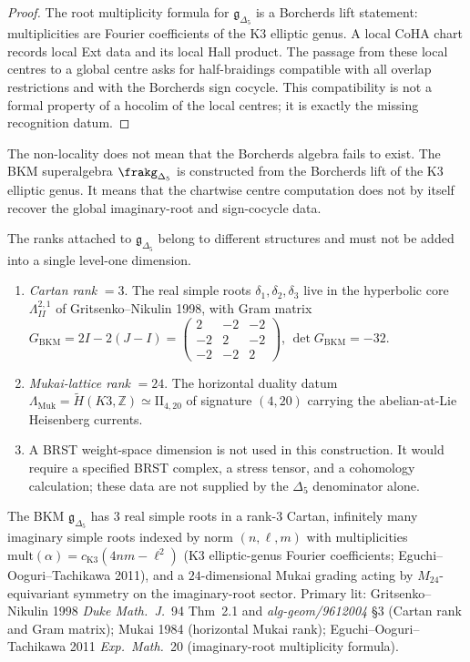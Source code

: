 \begin{proof}
The root multiplicity formula for \(\mathfrak g_{\Delta_5}\) is a
Borcherds lift statement: multiplicities are Fourier coefficients of
the K3 elliptic genus. A local CoHA chart records local Ext data and
its local Hall product. The passage from these local centres to a
global centre asks for half-braidings compatible with all overlap
restrictions and with the Borcherds sign cocycle. This compatibility is
not a formal property of a hocolim of the local centres; it is exactly
the missing recognition datum.
\end{proof}

\begin{remark}
\label{rem:k3e-nonlocality-interpretation}
The non-locality does not mean that the Borcherds algebra fails to
exist. The BKM superalgebra \(\frakg_{\Delta_5}\) is constructed from
the Borcherds lift of the K3 elliptic genus. It means that the
chartwise centre computation does not by itself recover the global
imaginary-root and sign-cocycle data.
\end{remark}

\begin{remark}
\label{rem:drinfeld-center-rank-discipline}
The ranks attached to \(\mathfrak{g}_{\Delta_5}\) belong to different
structures and must not be added into a single level-one dimension.
\begin{enumerate}[label=\textup{(\roman*)}]
\item \emph{Cartan rank} $= 3$. The real simple roots
 $\delta_1,\delta_2,\delta_3$ live in the hyperbolic core
 $\Lambda^{2,1}_{II}$ of Gritsenko--Nikulin 1998, with Gram matrix
 $G_{\mathrm{BKM}} = 2I - 2(J-I) = \begin{pmatrix}2&-2&-2\\-2&2&-2\\-2&-2&2\end{pmatrix}$,
 $\det G_{\mathrm{BKM}} = -32$.
\item \emph{Mukai-lattice rank} $= 24$. The horizontal duality datum
 $\Lambda_{\mathrm{Muk}} = \widetilde H(K3,\mathbb Z)\simeq\mathrm{II}_{4,20}$
 of signature $(4,20)$ carrying the abelian-at-Lie Heisenberg currents.
\item A BRST weight-space dimension is not used in this construction.
It would require a specified BRST complex, a stress tensor, and a
cohomology calculation; these data are not supplied by the
\(\Delta_5\) denominator alone.
\end{enumerate}
The BKM $\mathfrak{g}_{\Delta_5}$ has $3$ real simple roots in a
rank-$3$ Cartan, infinitely many imaginary simple roots indexed by
norm $(n,\ell,m)$ with multiplicities
$\mathrm{mult}(\alpha) = c_{\mathrm{K3}}(4nm-\ell^2)$
(K3 elliptic-genus Fourier coefficients; Eguchi--Ooguri--Tachikawa
2011), and a $24$-dimensional Mukai grading acting by
$M_{24}$-equivariant symmetry on the imaginary-root sector. Primary
lit: Gritsenko--Nikulin 1998 \emph{Duke Math.\ J.}~94 Thm~2.1 and
\emph{alg-geom/9612004} \S3 (Cartan rank and Gram matrix);
Mukai 1984 (horizontal Mukai rank);
Eguchi--Ooguri--Tachikawa 2011 \emph{Exp.\ Math.}~20 (imaginary-root
multiplicity formula).
\end{remark}


